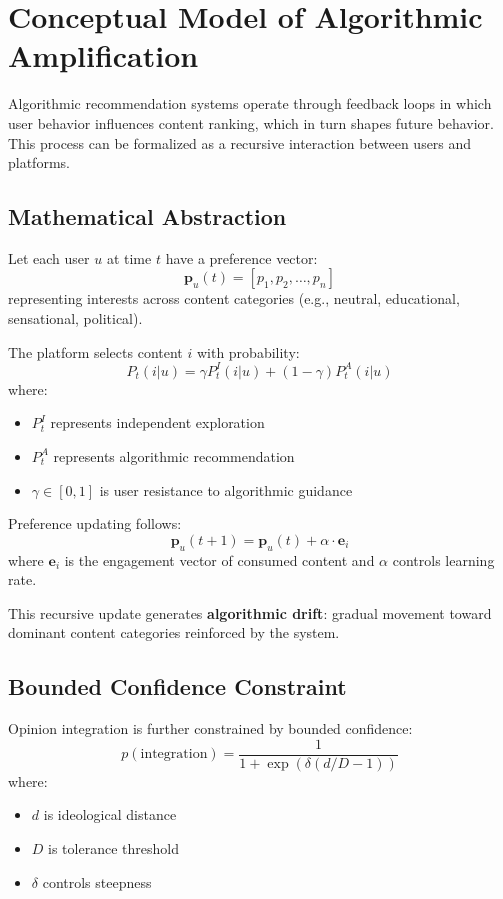 \documentclass[12pt,a4paper]{report}
\begin{document}
\section{Conceptual Model of Algorithmic Amplification}

Algorithmic recommendation systems operate through feedback loops in which user behavior influences content ranking, which in turn shapes future behavior. This process can be formalized as a recursive interaction between users and platforms.

\subsection{Mathematical Abstraction}

Let each user $u$ at time $t$ have a preference vector:
\[
  \mathbf{p}_u(t) = [p_1, p_2, \dots, p_n]
\]
representing interests across content categories (e.g., neutral, educational, sensational, political).

The platform selects content $i$ with probability:
\[
  P_t(i|u) = \gamma P^I_t(i|u) + (1-\gamma) P^A_t(i|u)
\]
where:
\begin{itemize}
  \item $P^I_t$ represents independent exploration
  \item $P^A_t$ represents algorithmic recommendation
  \item $\gamma \in [0,1]$ is user resistance to algorithmic guidance
\end{itemize}

Preference updating follows:
\[
  \mathbf{p}_u(t+1) = \mathbf{p}_u(t) + \alpha \cdot \mathbf{e}_i
\]
where $\mathbf{e}_i$ is the engagement vector of consumed content and $\alpha$ controls learning rate.

This recursive update generates \textbf{algorithmic drift}: gradual movement toward dominant content categories reinforced by the system.

\subsection{Bounded Confidence Constraint}

Opinion integration is further constrained by bounded confidence:
\[
  p(\text{integration}) = \frac{1}{1 + \exp(\delta(d/D - 1))}
\]
where:
\begin{itemize}
  \item $d$ is ideological distance
  \item $D$ is tolerance threshold
  \item $\delta$ controls steepness
\end{itemize}
\end{document}
